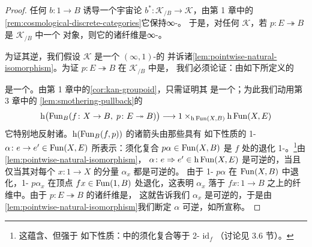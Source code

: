 \begin{proof}
任何\trElement{} $b\colon 1\to B$ 诱导一个宇宙论\trFunctor{}
$b^{*}\colon\mathcal{K}_{/B}\to\mathcal{K}$，由第 1 章中的%
\cref{rem:cosmological-discrete-categories}它保持\trDiscrete{}∞-\trCategory。
于是，对任何\trInfinityCosmos{} $\mathcal{K}$，若
$p\colon E\twoheadrightarrow B$ 是 $\mathcal{K}_{/B}$ 中一个\trDiscrete{}%
对象，则它的诸纤维是\trDiscrete{}∞-\trCategory。

为证其逆，我们假设 $\mathcal{K}$ 是一个 $(\infty,1)$-\trCategory{}的%
\trInfinityCosmos{}并诉诸\cref{lem:pointwise-natural-isomorphism}。为证
$p\colon E\twoheadrightarrow B$ 在 $\mathcal{K}_{/B}$ 中是\trDiscrete，
我们必须论证：由如下\trPullback{}所定义的\trQuasiCategory
\begin{center}
\end{center}
是一个\trKanComplex。由第 1 章中的\cref{cor:kan-groupoid}，只需证明其%
\trHomotopyCategory{}是一个\trGroupoid；为此我们动用第 3 章中的%
\cref{lem:smothering-pullback}的\trSmotheringFunctor
\[
\mathrm{h}\bigl(\operatorname{Fun}_{B}(f\colon X\to B,\; p\colon E\twoheadrightarrow B)\bigr)
  \longrightarrow 1\times_{\mathrm{h}\operatorname{Fun}(X,B)}\mathrm{h}\operatorname{Fun}(X,E)
\]
它特别地反射诸\trIsomorphism。$\mathrm{h}(\operatorname{Fun}_{B}(f,p))$ 的诸箭头由那些具有
如下性质的 1-\trSimplex{} $\alpha\colon e\to e'\in\operatorname{Fun}(X,E)$ 所表示：须化复合
$p\alpha\in\operatorname{Fun}(X,B)$ 是 $f$ 处的退化 1-\trSimplex。\footnote{这蕴含、但强于
如下性质：\trHomotopyTwoCategory{}中的须化复合等于 2-\trCell{} $\mathrm{id}_{f}$
（讨论见 3.6 节）。}由\cref{lem:pointwise-natural-isomorphism}，%
\trNaturalTransformation{} $\alpha\colon e\Rightarrow e'\in\mathrm{h}\operatorname{Fun}(X,E)$
是可逆的，当且仅当其对每个 $x\colon 1\to X$ 的分量 $\alpha_{x}$ 都是可逆的。
由于 1-\trSimplex{} $p\alpha$ 在 $\operatorname{Fun}(X,B)$ 中退化，1-\trSimplex{} $p\alpha_{x}$
在顶点 $fx\in\operatorname{Fun}(1,B)$ 处退化，这表明 $\alpha_{x}$ 落于 $fx\colon 1\to B$
之上的纤维中。由于 $p\colon E\twoheadrightarrow B$ 的诸纤维是\trDiscrete，
这就告诉我们 $\alpha_{x}$ 是可逆的，于是由%
\cref{lem:pointwise-natural-isomorphism}我们断定 $\alpha$ 可逆，如所宣称。
\end{proof}

